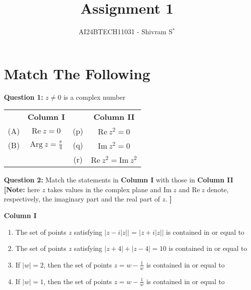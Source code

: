 \documentclass[journal,12pt,twocolumn]{IEEEtran}
\theoremstyle{remark}
\newcommand{\RE}{\mathrm{Re}}
\newcommand{\IM}{\mathrm{Im}}
\begin{document}

\vspace{3cm}

\title{Assignment 1}
\author{AI24BTECH11031 - Shivram S$^{*}$%
}
\maketitle
\newpage
\bigskip

\renewcommand{\thefigure}{\theenumi}
\renewcommand{\thetable}{\theenumi}
\section{Match The Following}

\textbf{Question 1:} $z \ne 0$ is a complex number
\hspace*{\fill} {\color{magenta}}

\begin{tabular}{ c c c c }
		& \textbf{Column I}			&		& \textbf{Column II}		\\
	(A) & $\RE\ z = 0$				& (p)	& $\RE\ z^2  = 0$			\\
	(B) & $\mathrm{Arg}\ z = \frac\pi4$		& (q)	& $\IM\ z^2  = 0$	\\
		&							& (r)	& $\RE\ z^2  = \IM\ z^2$
\end{tabular}

\textbf{Question 2:} Match the statements in \textbf{Column I} with those in \textbf{Column II}
\hspace*{\fill} {\color{magenta}} \\
\textbf{[Note:} here $z$ takes values in the complex plane and $\IM\ z$ and $\RE\ z$
denote, respectively, the imaginary part and the real part of $z$. \textbf{]}

\textbf{Column I}
\begin{enumerate}[label=(\Alph*)]
	\item The set of points $z$ satisfying $|z - i|z||$ = $|z + i|z||$ is contained in or equal to
	\item The set of points $z$ satisfying $|z + 4| + |z - 4| = 10$ is contained in or equal to
	\item If $|w| = 2$, then the set of points $z = w - \frac 1 w$ is contained in or equal to
	\item If $|w| = 1$, then the set of points $z = w - \frac 1 w$ is contained in or equal to
\end{enumerate}
\end{document}
